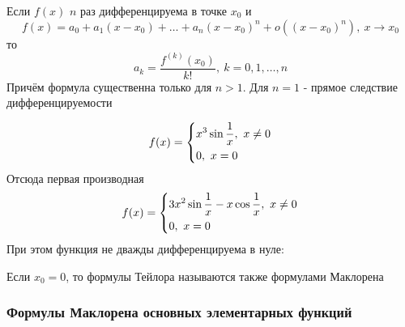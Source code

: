 \begin{corollary}
	Если $f(x)$ $n$ раз дифференцируема в точке $x_0$ и
	\[
		f(x) = a_0 + a_1(x - x_0) + \ldots + a_n(x - x_0)^n + o\left((x - x_0)^n\right),\ x \to x_0
	\]
	то
	\[
		a_k = \frac{f^{(k)}(x_0)}{k!},\ k = 0, 1, \ldots, n
	\]
	Причём формула существенна только для $n > 1$. Для $n = 1$ - прямое следствие дифференцируемости
\end{corollary}

\begin{example}
	\[
		f(x) = \left\{\begin{aligned}
			&x^3 \sin \frac{1}{x},\ x \neq 0
			\\
			&0,\ x = 0
		\end{aligned}\right.
	\]
	Отсюда первая производная
	\[
		f(x) = \left\{\begin{aligned}
			&3x^2 \sin \frac{1}{x} - x \cos \frac{1}{x},\ x \neq 0
			\\
			&0,\ x = 0
		\end{aligned}\right.
	\]
	При этом функция не дважды дифференцируема в нуле:
\end{example}

\begin{note}
	Если $x_0 = 0$, то формулы Тейлора называются также формулами Маклорена
\end{note}

\subsubsection*{Формулы Маклорена основных элементарных функций}

